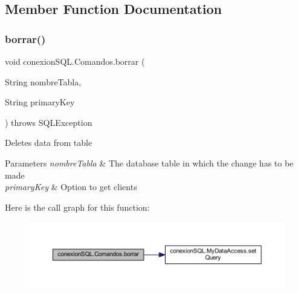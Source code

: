 \subsection{Member Function Documentation}
\mbox{\label{classconexion_s_q_l_1_1_comandos_a1a53c5650458c357ecd43cfc2734ad83}} 
\subsubsection{\texorpdfstring{borrar()}{borrar()}}
{\footnotesize\ttfamily void conexion\+S\+Q\+L.\+Comandos.\+borrar (\begin{DoxyParamCaption}\item[{String}]{nombre\+Tabla,  }\item[{String}]{primary\+Key }\end{DoxyParamCaption}) throws S\+Q\+L\+Exception}

Deletes data from table 
\begin{DoxyParams}{Parameters}
{\em nombre\+Tabla} & The database table in which the change has to be made \\
\hline
{\em primary\+Key} & Option to get clients \\
\hline
\end{DoxyParams}
Here is the call graph for this function\+:
\nopagebreak
\begin{figure}[H]
\begin{center}
\leavevmode
\includegraphics[width=350pt]{classconexion_s_q_l_1_1_comandos_a1a53c5650458c357ecd43cfc2734ad83_cgraph}
\end{center}
\end{figure}
\mbox{\label{classconexion_s_q_l_1_1_comandos_a2fb20845cbfb01a03b1aba60031608cb}} 
